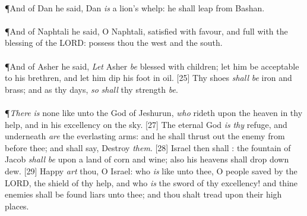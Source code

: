 \\
\P \textcolor[cmyk]{0.99998,1,0,0}{And of Dan he said, Dan \emph{is} a lion's whelp: he shall leap from Bashan.}\\
\\
\P \textcolor[cmyk]{0.99998,1,0,0}{And of Naphtali he said, O Naphtali, satisfied with favour, and full with the blessing of the LORD: possess thou the west and the south.}\\
\\
\P \textcolor[cmyk]{0.99998,1,0,0}{And of Asher he said, \emph{Let} Asher \emph{be} blessed with children; let him be acceptable to his brethren, and let him dip his foot in oil.}
[25] \textcolor[cmyk]{0.99998,1,0,0}{Thy shoes \emph{shall} \emph{be} iron and brass; and as thy days, \emph{so} \emph{shall} thy strength \emph{be}.}\\
\\
\P \textcolor[cmyk]{0.99998,1,0,0}{\emph{There} \emph{is} none like unto the God of Jeshurun, \emph{who} rideth upon the heaven in thy help, and in his excellency on the sky.}
[27] \textcolor[cmyk]{0.99998,1,0,0}{The eternal God \emph{is} \emph{thy} refuge, and underneath \emph{are} the everlasting arms: and he shall thrust out the enemy from before thee; and shall say, Destroy \emph{them}.}
[28] \textcolor[cmyk]{0.99998,1,0,0}{Israel then shall : the fountain of Jacob \emph{shall} \emph{be} upon a land of corn and wine; also his heavens shall drop down dew.}
[29] \textcolor[cmyk]{0.99998,1,0,0}{Happy \emph{art} thou, O Israel: who \emph{is} like unto thee, O people saved by the LORD, the shield of thy help, and who \emph{is} the sword of thy excellency! and thine enemies shall be found liars unto thee; and thou shalt tread upon their high places.}

